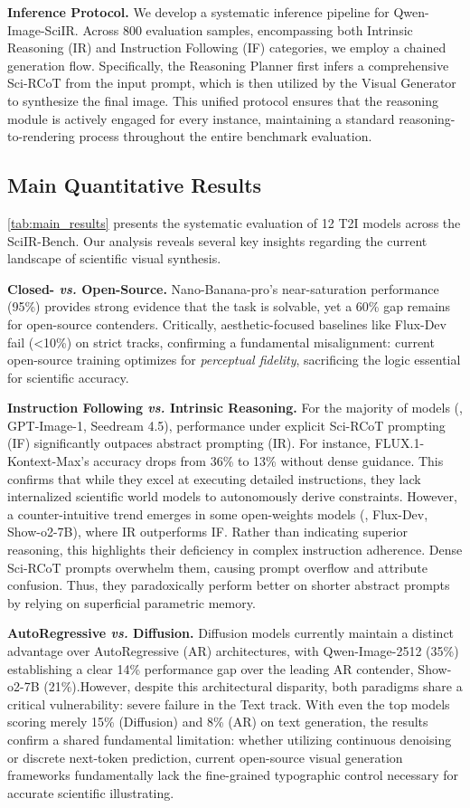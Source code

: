 \documentclass[runningheads]{llncs}
\begin{document}
\textbf{Inference Protocol.} We develop a systematic inference pipeline for Qwen-Image-SciIR. Across 800 evaluation samples, encompassing both Intrinsic Reasoning (IR) and Instruction Following (IF) categories, we employ a chained generation flow. Specifically, the Reasoning Planner first infers a comprehensive Sci-RCoT from the input prompt, which is then utilized by the Visual Generator to synthesize the final image. This unified protocol ensures that the reasoning module is actively engaged for every instance, maintaining a standard reasoning-to-rendering process throughout the entire benchmark evaluation.

\subsection{Main Quantitative Results}
\cref{tab:main_results} presents the systematic evaluation of 12 T2I models across the SciIR-Bench. Our analysis reveals several key insights regarding the current landscape of scientific visual synthesis.

\textbf{Closed- \textit{vs.} Open-Source.}
Nano-Banana-pro's near-saturation performance (95\%) provides strong evidence that the task is solvable, yet a 60\% gap remains for open-source contenders. Critically, aesthetic-focused baselines like Flux-Dev fail (<10\%) on strict tracks, confirming a fundamental misalignment: current open-source training optimizes for \textit{perceptual fidelity}, sacrificing the logic essential for scientific accuracy.

\textbf{Instruction Following \textit{vs.} Intrinsic Reasoning.}
For the majority of models (\eg, GPT-Image-1, Seedream 4.5), performance under explicit Sci-RCoT prompting (IF) significantly outpaces abstract prompting (IR). For instance, FLUX.1-Kontext-Max's accuracy drops from 36\% to 13\% without dense guidance. This confirms that while they excel at executing detailed instructions, they lack internalized scientific world models to autonomously derive constraints. However, a counter-intuitive trend emerges in some open-weights models (\eg, Flux-Dev, Show-o2-7B), where IR outperforms IF. Rather than indicating superior reasoning, this highlights their deficiency in complex instruction adherence. Dense Sci-RCoT prompts overwhelm them, causing prompt overflow and attribute confusion. Thus, they paradoxically perform better on shorter abstract prompts by relying on superficial parametric memory.

\textbf{AutoRegressive \textit{vs.} Diffusion.}
Diffusion models currently maintain a distinct advantage over AutoRegressive (AR) architectures, with Qwen-Image-2512 (35\%) establishing a clear 14\% performance gap over the leading AR contender, Show-o2-7B (21\%).However, despite this architectural disparity, both paradigms share a critical vulnerability: severe failure in the Text track. With even the top models scoring merely 15\% (Diffusion) and 8\% (AR) on text generation, the results confirm a shared fundamental limitation: whether utilizing continuous denoising or discrete next-token prediction, current open-source visual generation frameworks fundamentally lack the fine-grained typographic control necessary for accurate scientific illustrating. 
\end{document}
